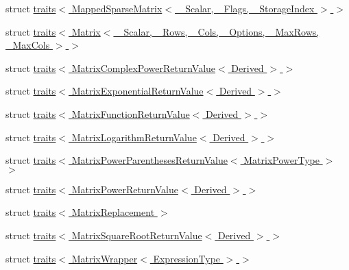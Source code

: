 \begin{DoxyCompactItemize}
\item 
struct \hyperlink{struct_eigen_1_1internal_1_1traits_3_01_mapped_sparse_matrix_3_01___scalar_00_01___flags_00_01___storage_index_01_4_01_4}{traits$<$ Mapped\+Sparse\+Matrix$<$ \+\_\+\+Scalar, \+\_\+\+Flags, \+\_\+\+Storage\+Index $>$ $>$}
\item 
struct \hyperlink{struct_eigen_1_1internal_1_1traits_3_01_matrix_3_01___scalar_00_01___rows_00_01___cols_00_01___o4c9772ffb3eee7280611af9a479b3583}{traits$<$ Matrix$<$ \+\_\+\+Scalar, \+\_\+\+Rows, \+\_\+\+Cols, \+\_\+\+Options, \+\_\+\+Max\+Rows, \+\_\+\+Max\+Cols $>$ $>$}
\item 
struct \hyperlink{struct_eigen_1_1internal_1_1traits_3_01_matrix_complex_power_return_value_3_01_derived_01_4_01_4}{traits$<$ Matrix\+Complex\+Power\+Return\+Value$<$ Derived $>$ $>$}
\item 
struct \hyperlink{struct_eigen_1_1internal_1_1traits_3_01_matrix_exponential_return_value_3_01_derived_01_4_01_4}{traits$<$ Matrix\+Exponential\+Return\+Value$<$ Derived $>$ $>$}
\item 
struct \hyperlink{struct_eigen_1_1internal_1_1traits_3_01_matrix_function_return_value_3_01_derived_01_4_01_4}{traits$<$ Matrix\+Function\+Return\+Value$<$ Derived $>$ $>$}
\item 
struct \hyperlink{struct_eigen_1_1internal_1_1traits_3_01_matrix_logarithm_return_value_3_01_derived_01_4_01_4}{traits$<$ Matrix\+Logarithm\+Return\+Value$<$ Derived $>$ $>$}
\item 
struct \hyperlink{struct_eigen_1_1internal_1_1traits_3_01_matrix_power_parentheses_return_value_3_01_matrix_power_type_01_4_01_4}{traits$<$ Matrix\+Power\+Parentheses\+Return\+Value$<$ Matrix\+Power\+Type $>$ $>$}
\item 
struct \hyperlink{struct_eigen_1_1internal_1_1traits_3_01_matrix_power_return_value_3_01_derived_01_4_01_4}{traits$<$ Matrix\+Power\+Return\+Value$<$ Derived $>$ $>$}
\item 
struct \hyperlink{struct_eigen_1_1internal_1_1traits_3_01_matrix_replacement_01_4}{traits$<$ Matrix\+Replacement $>$}
\item 
struct \hyperlink{struct_eigen_1_1internal_1_1traits_3_01_matrix_square_root_return_value_3_01_derived_01_4_01_4}{traits$<$ Matrix\+Square\+Root\+Return\+Value$<$ Derived $>$ $>$}
\item 
struct \hyperlink{struct_eigen_1_1internal_1_1traits_3_01_matrix_wrapper_3_01_expression_type_01_4_01_4}{traits$<$ Matrix\+Wrapper$<$ Expression\+Type $>$ $>$}
\item 

\end{DoxyCompactItemize}

